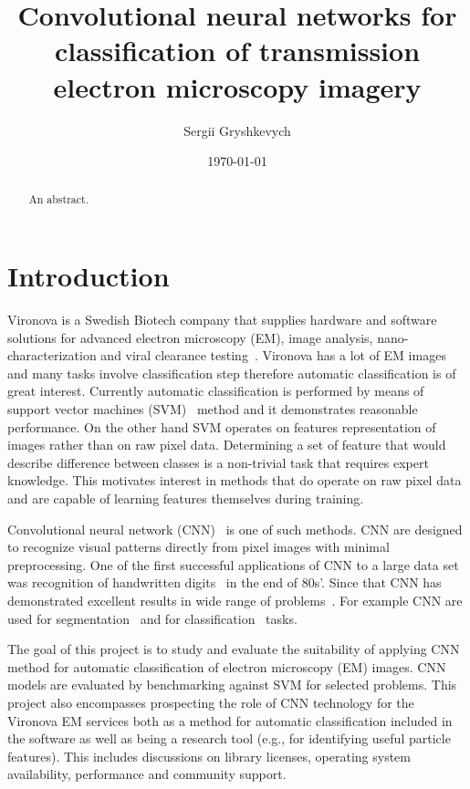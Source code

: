 \documentclass[a4paper, 11pt, table]{article}
\title{Convolutional neural networks for classification of transmission electron microscopy imagery}
\author{Sergii Gryshkevych}
\date{\today}
\begin{document}
\maketitle

\tableofcontents

\begin{abstract}
An abstract.
\end{abstract}

\section{Introduction}
Vironova is a Swedish Biotech company that supplies hardware and software solutions for advanced electron microscopy (EM), image analysis, nano-characterization and viral clearance testing~\cite{virnonva_linkedin}. Vironova has a lot of EM images and many tasks involve classification step therefore automatic classification is of great interest. Currently automatic classification is performed by means of support vector machines (SVM)~\cite{Boser:1992:TAO:130385.130401} method and it demonstrates reasonable performance. On the other hand SVM operates on features representation of images rather than on raw pixel data. Determining a set of feature that would describe difference between classes is a non-trivial task that requires expert knowledge. This motivates interest in methods that do operate on raw pixel data and are capable of learning features themselves during training. 

Convolutional neural network (CNN)~\cite{LeCun1986} is one of such methods. CNN are designed to recognize visual patterns directly from pixel images with minimal preprocessing. One of the first successful applications of CNN to a large data set was recognition of handwritten digits~\cite{41400} in the end of 80s'. Since that CNN has demonstrated excellent results in wide range of problems~\cite{NIPS2012_4824, DBLP:journals/corr/LinCY13}. For example CNN are used for segmentation~\cite{DBLP:journals/corr/ShelhamerLD16, Ronneberger2015} and for classification~\cite{NIPS2012_4824, DBLP:journals/corr/abs-1202-2745} tasks.

The goal of this project is to study and evaluate the suitability of applying CNN method for automatic classification of electron microscopy (EM) images. CNN models are evaluated by benchmarking against SVM for selected problems. This project also encompasses prospecting the role of CNN technology for the Vironova EM services both as a method for automatic classification included in the software as well as being a research tool (e.g., for identifying useful particle features). This includes discussions on library licenses, operating system availability, performance and community support.
\end{document}
